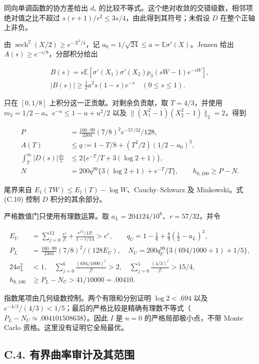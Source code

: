 \documentclass[11pt,a4paper]{article}
\begin{document}
同向单调函数的协方差给出 \(d_r\)
的比较不等式。这个绝对收敛的交错级数，相邻项绝对值之比不超过
\(s(r+1)/r^2\le3s/4\)，由此得到其符号；未假设 \(D\) 在整个正轴上非负。

由 \(\operatorname{sech}^2(X/2)\ge e^{-X^2/4}\)，记
\(a_0=1/\sqrt{24}\le a=\mathbb E\sigma'(X)\)。Jensen 给出
\(A(s)\ge e^{-s/8}\)，分部积分给出

\[
\begin{gathered}
B(s)=s\mathbb E[\sigma'(X_1)\sigma'(X_2)p_3(sW-1)e^{-sW}],\\
|B(s)|\ge\tfrac12a^2s(1-s)e^{-s}\quad(0\le s\le1).
\end{gathered}
\tag{C.11}
\]

只在 \([0,1/8]\) 上积分这一正贡献。对剩余负贡献，取 \(T=4/3\)，并使用
\(m_2=1/2-a\)、\(e^{-u}\le1-u+u^2/2\) 以及
\(\|(X_1^2-1)(X_2^2-1)\|_2=2\)，得到

\[
\begin{aligned}
P&=\frac{100\cdot99}{2304}(7/8)^2e^{-57/32}/128,\\
A(T)&\le q:=1-T/8+(T^2/2)(1/2-a_0)^3,\\
\int_T^\infty|D(s)|\frac{ds}{s}&\le2\{e^{-T}/T+3(\log2+1)\},\\
N&=200q^{99}\{3(\log2+1)+e^{-T}/T\},\qquad h_{0,100}\ge P-N.
\end{aligned}
\tag{C.12}
\]

尾界来自 \(E_1(TW)\le E_1(T)-\log W\)、Cauchy--Schwarz 及 Minkowski。式
(C.10) 控制 \(D\) 积分的其余部分。

严格数值门只使用有理数运算。取 \(a_L=204124/10^6\)、\(r=57/32\)，并令

\[
\begin{aligned}
E_U&=\sum_{j=0}^{12}\frac{r^j}{j!}+\frac{r^{13}/13!}{1-r/14}>e^r,\qquad
q_U=1-\tfrac16+\tfrac89(\tfrac12-a_L)^3,\\
P_L&=\frac{100\cdot99}{2304}(7/8)^2/(128E_U),\quad
N_U=200q_U^{99}\{3(694/1000+1)+1/5\},\\
24a_L^2&<1,\quad\sum_{j=0}^{6}\frac{(694/1000)^j}{j!}>2,\quad
\sum_{j=0}^{5}\frac{(4/3)^j}{j!}>15/4,\\
h_{0,100}&\ge P_L-N_U>41/10000=.00410.
\end{aligned}
\tag{C.13}
\]

指数尾项由几何级数控制。两个有限和分别证明 \(\log2<.694\) 以及
\(e^{-4/3}/(4/3)<1/5\)；最后的严格比较是精确有理数不等式（\(P_L-N_U\simeq.004101508638\)）。因此
\(I\) 是 \(n=0\) 的严格局部极小点，不带 Monte Carlo
资格。这里没有证明它全局最优。

\subsection*{C.4.
有界曲率审计及其范围}\label{c.4.-ux6709ux754cux66f2ux7387ux5ba1ux8ba1ux53caux5176ux8303ux56f4}
\end{document}
